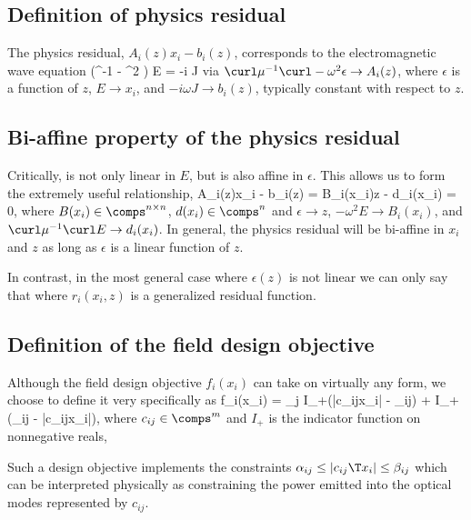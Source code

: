 \documentclass{book}
\begin{document}
\subsection{Definition of physics residual}
The physics residual, $A_i(z)x_i - b_i(z)$, 
    corresponds to the electromagnetic wave equation
        {(\curl \mu^{-1} \curl - \omega^2 \epsilon) E = -i \omega J}
        via
    \BI $\curl \mu^{-1} \curl - \omega^2 \epsilon \to A_i(z)$, where $\epsilon$ is a function of $z$,
    \I  $E \to x_i$, and
    \I  $-i \omega J \to b_i(z)$, typically constant with respect to $z$. \EI

\subsection{Bi-affine property of the physics residual}
Critically,  is not only linear in $E$,
    but is also affine in $\epsilon$.
This allows us to form the extremely useful relationship,
        {A_i(z)x_i - b_i(z) = B_i(x_i)z - d_i(x_i) = 0,}
    where $B(x_i) \in \comps^{n \times n}$, $d(x_i) \in \comps^n$ and
    \BI $\epsilon \to z$,
    \I  $-\omega^2 E \to B_i(x_i)$, and
    \I  $\curl \mu^{-1} \curl E \to d_i(x_i)$. \EI
In general, the physics residual will be bi-affine in $x_i$ and $z$ 
    as long as $\epsilon$ is a linear function of $z$.

In contrast, in the most general case where $\epsilon(z)$ is not linear 
    we can only say that
    where $r_i(x_i, z)$ is a generalized residual function.


\subsection{Definition of the field design objective}
Although the field design objective $f_i(x_i)$ 
    can take on virtually any form,
    we choose to define it very specifically as
        {f_i(x_i) = \sum_j I_+(|c_{ij}\T x_i| - \alpha_{ij})
            + I_+(\beta_{ij} - |c_{ij}\T x_i|),}
    where $c_{ij} \in \comps^m$ and 
    $I_+$ is the indicator function on nonnegative reals,

Such a design objective implements the constraints 
    $\alpha_{ij} \le |c_{ij}\T x_i| \le \beta_{ij}$
    which can be interpreted physically as 
    constraining the power emitted into the optical modes
    represented by $c_{ij}$.
\end{document}
